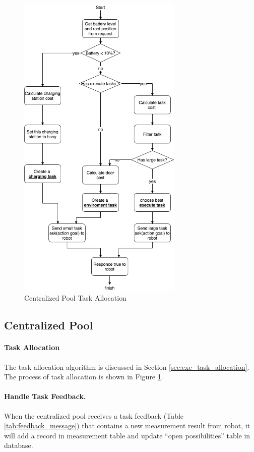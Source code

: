 \begin{figure}[htbp]
    \centering
    \includegraphics[width = 0.7\textwidth]{content/images/ch4/centralized_task_select.drawio.png}
    \caption{Centralized Pool Task Allocation}
    \label{fig:centralized_task_allocation}
\end{figure}
\subsection{Centralized Pool}

\paragraph{Task Allocation}
The task allocation algorithm is discussed in Section \ref{sec:exe_task_allocation}. The process of task allocation is shown in Figure \ref{fig:centralized_task_allocation}. 

\paragraph{Handle Task Feedback.}
When the centralized pool receives a task feedback (Table \ref{tab:feedback_message}) that contains a new measurement result from robot, it will add a record in measurement table and update ``open possibilities'' table in database.

